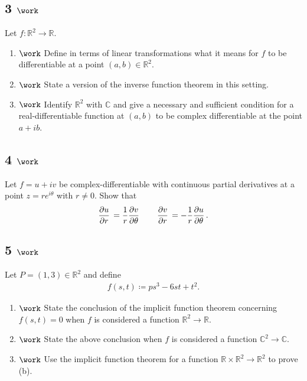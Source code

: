 \hypertarget{work-12}{%
\subsection{\texorpdfstring{3
\(\work\)}{3 \textbackslash work}}\label{work-12}}

Let \(f:{\mathbb{R}}^2\to {\mathbb{R}}\).

\begin{enumerate}
\def\labelenumi{\alph{enumi}.}
\item
  \(\work\) Define in terms of linear transformations what it means for
  \(f\) to be differentiable at a point \((a, b) \in {\mathbb{R}}^2\).
\item
  \(\work\) State a version of the inverse function theorem in this
  setting.
\item
  \(\work\) Identify \({\mathbb{R}}^2\) with \({\mathbb{C}}\) and give a
  necessary and sufficient condition for a real-differentiable function
  at \((a, b)\) to be complex differentiable at the point \(a+ib\).
\end{enumerate}

\hypertarget{work-13}{%
\subsection{\texorpdfstring{4
\(\work\)}{4 \textbackslash work}}\label{work-13}}

Let \(f = u+iv\) be complex-differentiable with continuous partial
derivatives at a point \(z = re^{i\theta}\) with \(r\neq 0\). Show that
\begin{align*}  
{\frac{\partial u}{\partial r}\,} = {1\over r}{\frac{\partial v}{\partial \theta}\,} \qquad {\frac{\partial v}{\partial r}\,} = -{1\over r}{\frac{\partial u}{\partial \theta}\,}
.\end{align*}

\hypertarget{work-14}{%
\subsection{\texorpdfstring{5
\(\work\)}{5 \textbackslash work}}\label{work-14}}

Let \(P = (1, 3) \in {\mathbb{R}}^2\) and define
\begin{align*}  
f(s, t) \coloneqq ps^3 -6st + t^2
.\end{align*}

\begin{enumerate}
\def\labelenumi{\alph{enumi}.}
\item
  \(\work\) State the conclusion of the implicit function theorem
  concerning \(f(s, t) = 0\) when \(f\) is considered a function
  \({\mathbb{R}}^2\to{\mathbb{R}}\).
\item
  \(\work\) State the above conclusion when \(f\) is considered a
  function \({\mathbb{C}}^2\to {\mathbb{C}}\).
\item
  \(\work\) Use the implicit function theorem for a function
  \({\mathbb{R}}\times{\mathbb{R}}^2 \to {\mathbb{R}}^2\) to prove (b).
\end{enumerate}

